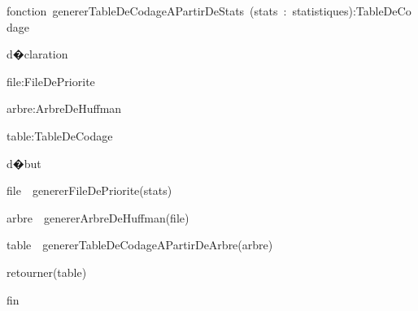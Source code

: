 

\makeatother

\usepackage{babel}

\begin{lyxcode}
fonction~genererTableDeCodageAPartirDeStats~(stats~:~statistiques):TableDeCodage

d�claration
\begin{lyxcode}
file:FileDePriorite

arbre:ArbreDeHuffman

table:TableDeCodage
\end{lyxcode}
d�but
\begin{lyxcode}
file~\textleftarrow{}~genererFileDePriorite(stats)

arbre~\textleftarrow{}~genererArbreDeHuffman(file)

table~\textleftarrow{}~genererTableDeCodageAPartirDeArbre(arbre)

retourner(table)
\end{lyxcode}
fin\end{lyxcode}


